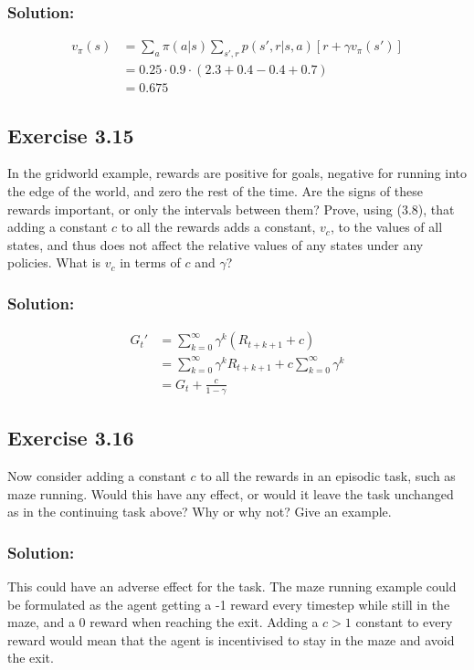 \subsubsection*{Solution:}

\begin{align*}
    v_\pi(s) &= \sum_a \pi(a|s) \sum_{s',r} p(s',r |s, a)\left[r + \gamma v_\pi(s')\right] \\
    &= 0.25 \cdot 0.9 \cdot (2.3 + 0.4 - 0.4 + 0.7) \\
    &= 0.675
\end{align*}

\subsection*{Exercise 3.15}
In the gridworld example, rewards are positive for goals, negative for
running into the edge of the world, and zero the rest of the time. Are the signs of these
rewards important, or only the intervals between them? Prove, using (3.8), that adding a
constant $c$ to all the rewards adds a constant, $v_c$, to the values of all states, and thus
does not affect the relative values of any states under any policies. What is $v_c$ in terms
of $c$ and $\gamma$? 

\subsubsection*{Solution:}
\begin{align*}
    G_t' &= \sum_{k=0}^{\infty}\gamma^k (R_{t+k+1}+c) \\
    &= \sum_{k=0}^{\infty}\gamma^k R_{t+k+1} + c \sum_{k=0}^{\infty}\gamma^k \\
    &= G_t + \frac{c}{1 - \gamma}
\end{align*}

\subsection*{Exercise 3.16}
Now consider adding a constant $c$ to all the rewards in an episodic task,
such as maze running. Would this have any effect, or would it leave the task unchanged
as in the continuing task above? Why or why not? Give an example.

\subsubsection*{Solution:}
This could have an adverse effect for the task. The maze running example could be formulated as the agent getting a -1 reward every timestep while still in the maze, and a 0 reward when reaching the exit. Adding a $c > 1$ constant to every reward would mean that the agent is incentivised to stay in the maze and avoid the exit.

